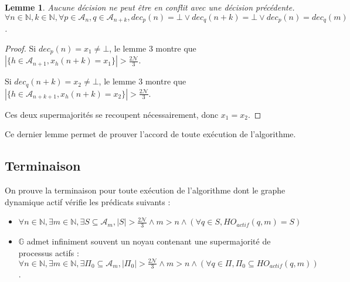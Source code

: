 \documentclass{article}
\newtheorem{lemma}{Lemme}
\begin{document}
\begin{lemma}
	Aucune décision ne peut être en conflit avec une décision précédente.
	$ \forall n \in \mathds{N}, k \in \mathds{N}, \forall p \in \mathcal{A}_n, q \in \mathcal{A}_{n+k},dec_p(n) = \bot \vee dec_q(n+k) = \bot \vee dec_p(n) = dec_q(m)$.
\end{lemma}
\begin{proof}

	Si $dec_p(n) = x_1 \neq \bot$,   le lemme 3 montre que $|\{h \in \mathcal{A}_{n+1}, x_h(n+k) = x_1\}| > \frac{2\mathcal{N}}{3}$.

	Si $dec_q(n+k) = x_2 \neq \bot$,   le lemme 3 montre que $|\{h \in \mathcal{A}_{n+k+1}, x_h(n+k) = x_2\}|> \frac{2\mathcal{N}}{3}$.

Ces deux supermajorités se recoupent nécessairement, donc $x_1 = x_2$.
\end{proof}

Ce dernier lemme permet de prouver l'accord de toute exécution de l'algorithme.

\subsection{Terminaison}

On prouve la terminaison pour toute exécution de l'algorithme dont le graphe dynamique actif vérifie les prédicats suivants :
\begin{itemize}
	\item $\forall n \in \mathds{N}, \exists m \in \mathds{N}, \exists S \subseteq \mathcal{A}_m, |S| > \frac{2\mathcal{N}}{3} \wedge m > n \wedge (\forall q \in S, HO_{actif}(q, m) = S)$
	\item $\mathds{G}$ admet infiniment souvent un noyau contenant une supermajorité de processus actifs :
		$\forall n \in \mathds{N}, \exists m \in \mathds{N}, \exists \Pi_0 \subseteq \mathcal{A}_m, |\Pi_0| > \frac{2\mathcal{N}}{3} \wedge m > n \wedge (\forall q \in \Pi, \Pi_0 \subseteq HO_{actif}(q,m))$.
\end{itemize}
\end{document}
